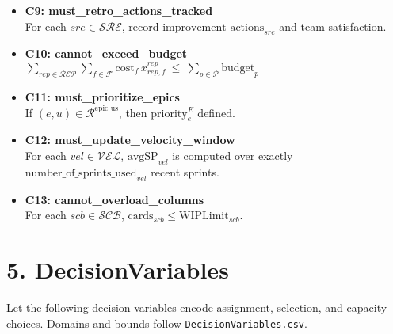 \documentclass[11pt,a4paper]{article}
\begin{document}
\begin{itemize}[leftmargin=2em]
  \item \textbf{C9: must\_retro\_actions\_tracked} \\
  For each $sre\in\mathcal{SRE}$, record $\text{improvement\_actions}_{sre}$ and team satisfaction.
  \item \textbf{C10: cannot\_exceed\_budget} \\
  $\displaystyle \sum_{rep\in\mathcal{REP}}\sum_{f\in\mathcal{F}} \text{cost}_f\, x^{rep}_{rep,f} \ \le\ \sum_{p\in\mathcal{P}} \text{budget}_p$
  \item \textbf{C11: must\_prioritize\_epics} \\
  If $(e,u)\in\mathcal{R}^{\text{epic\_us}}$, then $\text{priority}^{E}_e$ defined.
  \item \textbf{C12: must\_update\_velocity\_window} \\
  For each $vel\in\mathcal{VEL}$, $\text{avgSP}_{vel}$ is computed over exactly $\text{number\_of\_sprints\_used}_{vel}$ recent sprints.
  \item \textbf{C13: cannot\_overload\_columns} \\
  For each $scb\in\mathcal{SCB}$, $\text{cards}_{scb} \le \text{WIPLimit}_{scb}$.
\end{itemize}

\section{5. DecisionVariables}
Let the following decision variables encode assignment, selection, and capacity choices. Domains and bounds follow \texttt{DecisionVariables.csv}.
\end{document}
